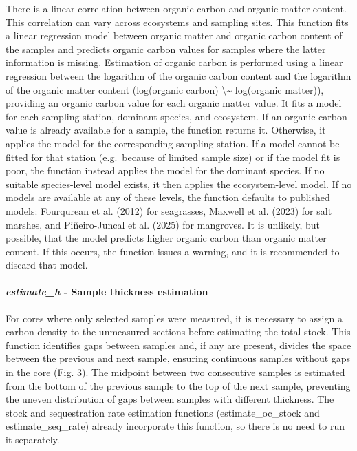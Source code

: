 \documentclass[10pt,a4paper,onecolumn]{article}
\let\oldparagraph\paragraph
\renewcommand{\paragraph}[1]{\oldparagraph{#1}\mbox{}}
\begin{document}
There is a linear correlation between organic carbon and organic matter
content. This correlation can vary across ecosystems and sampling sites.
This function fits a linear regression model between organic matter and
organic carbon content of the samples and predicts organic carbon values
for samples where the latter information is missing. Estimation of
organic carbon is performed using a linear regression between the
logarithm of the organic carbon content and the logarithm of the organic
matter content (log(organic carbon) \textbackslash\textasciitilde{}
log(organic matter)), providing an organic carbon value for each organic
matter value. It fits a model for each sampling station, dominant
species, and ecosystem. If an organic carbon value is already available
for a sample, the function returns it. Otherwise, it applies the model
for the corresponding sampling station. If a model cannot be fitted for
that station (e.g.~because of limited sample size) or if the model fit
is poor, the function instead applies the model for the dominant
species. If no suitable species-level model exists, it then applies the
ecosystem-level model. If no models are available at any of these
levels, the function defaults to published models: Fourqurean et al.
(2012) for seagrasses, Maxwell et al. (2023) for salt marshes, and
Piñeiro-Juncal et al. (2025) for mangroves. It is unlikely, but
possible, that the model predicts higher organic carbon than organic
matter content. If this occurs, the function issues a warning, and it is
recommended to discard that model.

\paragraph{\texorpdfstring{\textbf{\emph{estimate\_h}} \textbf{- Sample
thickness
estimation}}{estimate\_h - Sample thickness estimation}}\label{estimate_h---sample-thickness-estimation}

For cores where only selected samples were measured, it is necessary to
assign a carbon density to the unmeasured sections before estimating the
total stock. This function identifies gaps between samples and, if any
are present, divides the space between the previous and next sample,
ensuring continuous samples without gaps in the core (Fig. 3). The
midpoint between two consecutive samples is estimated from the bottom of
the previous sample to the top of the next sample, preventing the uneven
distribution of gaps between samples with different thickness. The stock
and sequestration rate estimation functions (estimate\_oc\_stock and
estimate\_seq\_rate) already incorporate this function, so there is no
need to run it separately.
\end{document}
